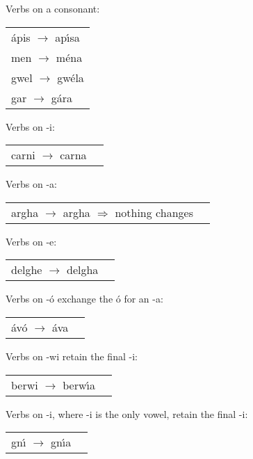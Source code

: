\noindent Verbs on a consonant:
\begin{table}[H]
\begin{tabu}{l}
  \'{a}pis $\rightarrow$ ap\'{\i}sa\\
  men $\rightarrow$ m\'{e}na\\
  gwel $\rightarrow$ gw\'{e}la\\
  gar $\rightarrow$ g\'{a}ra\\
\end{tabu}
\label{examples_verbs_oac}
\end{table}

\noindent Verbs on -i:
\begin{table}[H]
\begin{tabu}{ll}
  carni $\rightarrow$ carna
\end{tabu}
\label{examples_verbs_on_i}
\end{table}

\noindent Verbs on -a:
\begin{table}[H]
\begin{tabu}{ll}
  argha $\rightarrow$ argha $\Rightarrow$ nothing changes
\end{tabu}
\label{examples_verbs_on_a}
\end{table}

\noindent Verbs on -e:
\begin{table}[H]
\begin{tabu}{ll}
  delghe $\rightarrow$ delgha
\end{tabu}
\label{examples_verbs_on_e}
\end{table}

\noindent Verbs on -\'{o} exchange the \'{o} for an -a:
\begin{table}[H]
\begin{tabu}{ll}
  \'{a}v\'{o} $\rightarrow$ \'{a}va
\end{tabu}
\label{examples_verbs_on_oo}
\end{table}

\noindent Verbs on -wi retain the final -i:
\begin{table}[H]
\begin{tabu}{ll}
  berwi $\rightarrow$ berw\'{\i}a
\end{tabu}
\label{examples_verbs_on_wi}
\end{table}

\noindent Verbs on -i, where -i is the only vowel, retain the final -i:
\begin{table}[H]
\begin{tabu}{ll}
  gn\'{\i} $\rightarrow$ gn\'{\i}a
\end{tabu}
\label{examples_verbs_on_i_only_vowel}
\end{table}

